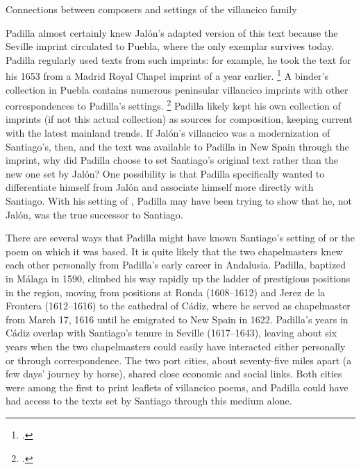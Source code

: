 \begin{table}
    \caption{Connections between composers and settings of the 
    villancico family}
  
    \label{tab:Voces-connections}
\end{table}

Padilla almost certainly knew Jalón's adapted version of this text because the
Seville imprint circulated to Puebla, where the only exemplar survives today.
Padilla regularly used texts from such imprints: for example, he took the text
for his 1653  from a Madrid Royal Chapel imprint
of a year earlier.%
    \footnote{.}
A binder's collection in Puebla contains numerous peninsular villancico imprints
with other correspondences to Padilla's settings.%
    \footnote{.}
Padilla likely kept his own collection of imprints (if not this actual
collection) as sources for composition, keeping current with the latest mainland
trends.
If Jalón's villancico was a modernization of Santiago's, then, and the text was
available to Padilla in New Spain through the imprint, why did Padilla choose to
set Santiago's original text rather than the new one set by Jalón?
One possibility is that Padilla specifically wanted to differentiate himself
from Jalón and associate himself more directly with Santiago.
With his setting of , Padilla may have been
trying to show that he, not Jalón, was the true successor to Santiago.

There are several ways that Padilla might have known Santiago's setting of
 or the poem on which it was based.
It is quite likely that the two chapelmasters knew each other personally from
Padilla's early career in Andalusia.
Padilla, baptized in Málaga in 1590, climbed his way rapidly up the ladder of
prestigious positions in the region, moving from positions at Ronda (1608--1612)
and Jerez de la Frontera (1612--1616) to the cathedral of Cádiz, where he served
as chapelmaster from March 17, 1616 until he emigrated to New Spain in 1622.%
    \Autocite{Gembero:Padilla}
Padilla's years in Cádiz overlap with Santiago's tenure in Seville (1617--1643),
leaving about six years when the two chapelmasters could easily have interacted
either personally or through correspondence.
The two port cities, about seventy-five miles apart (a few days' journey by
horse), shared close economic and social links.
Both cities were among the first to print leaflets of villancico poems, and
Padilla could have had access to the texts set by Santiago through this medium
alone.%
    \Autocite
    [ and \emph{Sevilla}]
    {BNE:VCs17C}

